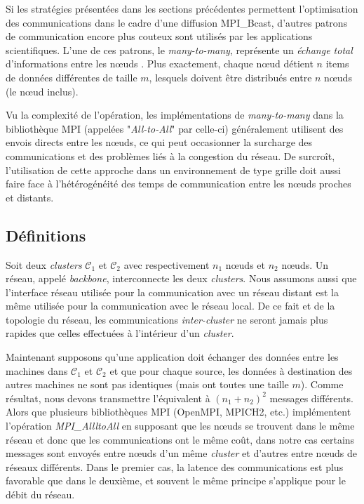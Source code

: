 Si les stratégies présentées dans les sections précédentes permettent l'optimisation des communications dans le cadre d'une diffusion MPI\_Bcast, d'autres patrons de communication encore plus couteux sont utilisés par les applications scientifiques. L'une de ces patrons, le \textit{many-to-many}, représente un \emph{échange total} d'informations entre les n{\oe}uds \cite{Christara99}. Plus exactement, chaque n{\oe}ud détient $n$ items de données différentes de taille $m$, lesquels doivent être distribués entre $n$ n{\oe}uds (le n{\oe}ud inclus).  

Vu la complexité de l'opération, les implémentations de \textit{many-to-many} dans la bibliothèque MPI (appelées "\textit{All-to-All}" par celle-ci) généralement utilisent des envois directs entre les n{\oe}uds, ce qui peut occasionner la surcharge des communications et des problèmes liés à la congestion du réseau. De surcroît, l'utilisation de cette approche dans un environnement de type grille doit aussi faire face à l'hétérogénéité des temps de communication entre les n{\oe}uds proches et distants.

\subsection{Définitions}

Soit deux \textit{clusters} ${\mathcal C}_1$
et ${\mathcal C}_2$ avec respectivement $n_1$ n{\oe}uds et $n_2$ n{\oe}uds.
Un réseau, appelé \textit{backbone}, interconnecte les deux \textit{clusters}. Nous assumons aussi que l'interface réseau utilisée pour la communication avec un réseau distant est la même utilisée pour la communication avec le réseau local. De ce fait et de la topologie du réseau, les communications \textit{inter-cluster} ne seront jamais plus rapides que celles effectuées à l'intérieur d'un \textit{cluster}.

Maintenant supposons qu'une application doit échanger des données entre les machines dans ${\mathcal C}_1$ et ${\mathcal C}_2$ et que pour chaque source, les données à destination des autres machines ne sont pas identiques (mais ont toutes une taille $m$).  Comme résultat, nous devons transmettre l'équivalent à $(n_1+ n_2)^2$ messages différents. Alors que plusieurs bibliothèques MPI  (OpenMPI, MPICH2, etc.) implémentent l'opération \textit{MPI\_AllltoAll} en supposant que les n{\oe}uds se trouvent dans le même réseau et donc que les communications ont le même coût, dans notre cas certains messages sont envoyés entre n{\oe}uds d'un même \textit{cluster} et d'autres entre n{\oe}uds de réseaux différents. Dans le premier cas, la latence des communications est plus favorable que dans le deuxième, et souvent le même principe s'applique pour le débit du réseau.


